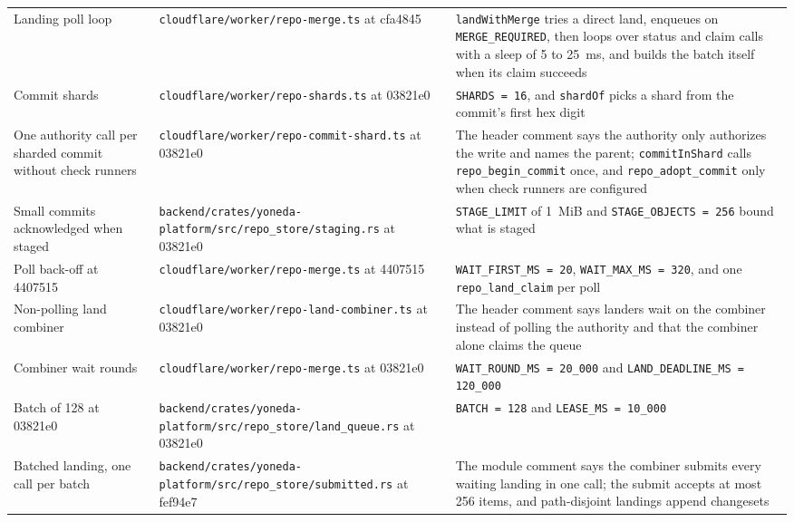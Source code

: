 \documentclass[11pt,letterpaper]{article}
\theoremstyle{definition}
\theoremstyle{remark}
\begin{document}
{\begin{longtable}{@{}L{3.0cm}L{5.3cm}L{7.2cm}@{}}
Landing poll loop & \nolinkurl{cloudflare/worker/repo-merge.ts} \newline at cfa4845 & \texttt{landWithMerge} tries a direct land, enqueues on \texttt{MERGE\_REQUIRED}, then loops over status and claim calls with a sleep of 5 to 25~ms, and builds the batch itself when its claim succeeds \\
Commit shards & \nolinkurl{cloudflare/worker/repo-shards.ts} \newline at 03821e0 & \texttt{SHARDS = 16}, and \texttt{shardOf} picks a shard from the commit's first hex digit \\
One authority call per sharded commit without check runners & \nolinkurl{cloudflare/worker/repo-commit-shard.ts} \newline at 03821e0 & The header comment says the authority only authorizes the write and names the parent; \texttt{commitInShard} calls \texttt{repo\_begin\_commit} once, and \texttt{repo\_adopt\_commit} only when check runners are configured \\
Small commits acknowledged when staged & \nolinkurl{backend/crates/yoneda-platform/src/repo_store/staging.rs} \newline at 03821e0 & \texttt{STAGE\_LIMIT} of 1~MiB and \texttt{STAGE\_OBJECTS = 256} bound what is staged \\
Poll back-off at 4407515 & \nolinkurl{cloudflare/worker/repo-merge.ts} \newline at 4407515 & \texttt{WAIT\_FIRST\_MS = 20}, \texttt{WAIT\_MAX\_MS = 320}, and one \texttt{repo\_land\_claim} per poll \\
Non-polling land combiner & \nolinkurl{cloudflare/worker/repo-land-combiner.ts} \newline at 03821e0 & The header comment says landers wait on the combiner instead of polling the authority and that the combiner alone claims the queue \\
Combiner wait rounds & \nolinkurl{cloudflare/worker/repo-merge.ts} \newline at 03821e0 & \texttt{WAIT\_ROUND\_MS = 20\_000} and \texttt{LAND\_DEADLINE\_MS = 120\_000} \\
Batch of 128 at 03821e0 & \nolinkurl{backend/crates/yoneda-platform/src/repo_store/land_queue.rs} \newline at 03821e0 & \texttt{BATCH = 128} and \texttt{LEASE\_MS = 10\_000} \\
Batched landing, one call per batch & \nolinkurl{backend/crates/yoneda-platform/src/repo_store/submitted.rs} \newline at fef94e7 & The module comment says the combiner submits every waiting landing in one call; the submit accepts at most 256 items, and path-disjoint landings append changesets \\

\end{longtable}}
\end{document}
